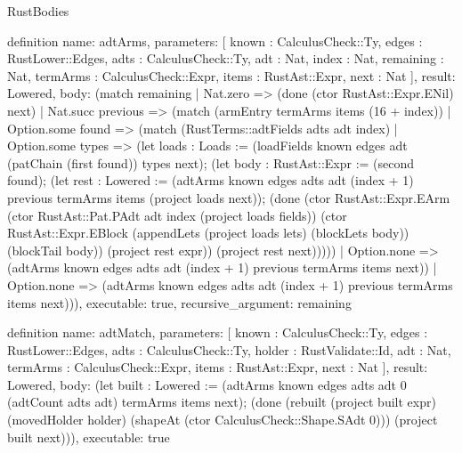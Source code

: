 \begin{lexlean}{RustBodies}
\begin{semanticmodule}
definition{
  name: adtArms,
  parameters: [
    known : CalculusCheck::Ty,
    edges : RustLower::Edges,
    adts : CalculusCheck::Ty,
    adt : Nat,
    index : Nat,
    remaining : Nat,
    termArms : CalculusCheck::Expr,
    items : RustAst::Expr,
    next : Nat
  ],
  result: Lowered,
  body: (match remaining
    | Nat.zero => (done (ctor RustAst::Expr.ENil) next)
    | Nat.succ previous => (match (armEntry termArms items (16 + index))
      | Option.some found => (match (RustTerms::adtFields adts adt index)
        | Option.some types => (let loads : Loads := (loadFields known edges adt (patChain (first found)) types next); (let body : RustAst::Expr := (second found); (let rest : Lowered := (adtArms known edges adts adt (index + 1) previous termArms items (project loads next)); (done (ctor RustAst::Expr.EArm (ctor RustAst::Pat.PAdt adt index (project loads fields)) (ctor RustAst::Expr.EBlock (appendLets (project loads lets) (blockLets body)) (blockTail body)) (project rest expr)) (project rest next)))))
        | Option.none => (adtArms known edges adts adt (index + 1) previous termArms items next))
      | Option.none => (adtArms known edges adts adt (index + 1) previous termArms items next))),
  executable: true,
  recursive_argument: remaining
}

definition{
  name: adtMatch,
  parameters: [
    known : CalculusCheck::Ty,
    edges : RustLower::Edges,
    adts : CalculusCheck::Ty,
    holder : RustValidate::Id,
    adt : Nat,
    termArms : CalculusCheck::Expr,
    items : RustAst::Expr,
    next : Nat
  ],
  result: Lowered,
  body: (let built : Lowered := (adtArms known edges adts adt 0 (adtCount adts adt) termArms items next); (done (rebuilt (project built expr) (movedHolder holder) (shapeAt (ctor CalculusCheck::Shape.SAdt 0))) (project built next))),
  executable: true
}


\end{semanticmodule}
\end{lexlean}
